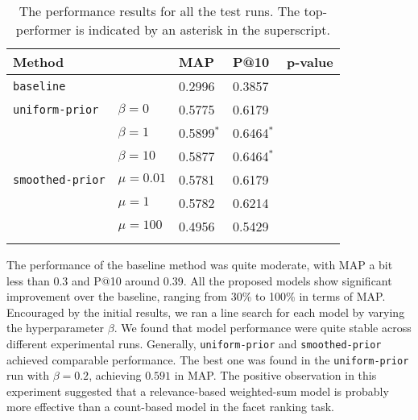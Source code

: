 \begin{table}[ht!]
  \centering
  \begin{tabular}{lllll}
    Method & & MAP & P@10 & p-value\\
    \hline
    {\tt baseline} & & 0.2996 & 0.3857 & \\
    {\tt uniform-prior} & $\beta = 0$ & 0.5775 & 0.6179 & \\
    & $\beta = 1$ & 0.5899$^*$ & 0.6464$^*$ & \\
    & $\beta = 10$ & 0.5877 & 0.6464$^*$ & \\
    {\tt smoothed-prior} & $\mu = 0.01$ & 0.5781 & 0.6179 &\\
    & $\mu = 1$ & 0.5782 & 0.6214 & \\
    & $\mu = 100$ & 0.4956 & 0.5429 & \\
    \\
  \end{tabular}
  \caption{The performance results for all the test runs.  The top-performer is
  indicated by an asterisk in the superscript.} \label{t:performance}
\end{table}

The performance of the baseline method was quite moderate, with MAP a bit less
than 0.3 and P@10 around 0.39.  All the proposed models show significant
improvement over the baseline, ranging from 30\% to 100\% in terms of MAP.
Encouraged by the initial results, we ran a line search for each model by
varying the hyperparameter $\beta$.  We found that model performance were quite
stable across different experimental runs.  Generally, {\tt uniform-prior} and
{\tt smoothed-prior} achieved comparable performance.  The best one was found
in the {\tt uniform-prior} run with $\beta = 0.2$, achieving $0.591$ in MAP.
The positive observation in this experiment suggested that a relevance-based
weighted-sum model is probably more effective than a count-based model in the
facet ranking task.  



